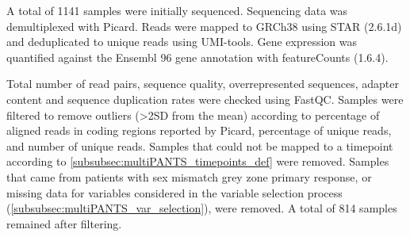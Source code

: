 A total of 1141 samples were initially sequenced.
Sequencing data was demultiplexed with Picard.
%
Reads were mapped to GRCh38 using STAR (2.6.1d) and deduplicated to unique reads using UMI-tools.
Gene expression was quantified against the Ensembl 96 gene annotation with featureCounts (1.6.4).

Total number of read pairs, sequence quality, overrepresented sequences, adapter content and sequence duplication rates were checked using FastQC.
Samples were filtered to remove outliers (>2SD from the mean) according to percentage of aligned reads in coding regions reported by Picard, percentage of unique reads, and number of unique reads.
Samples that could not be mapped to a timepoint according to \autoref{subsubsec:multiPANTS_timepoints_def} were removed.
Samples that came from patients with 
sex mismatch
grey zone primary response, 
or missing data for variables considered in the variable selection process (\autoref{subsubsec:multiPANTS_var_selection}),
were removed.
A total of 814 samples remained after filtering.


